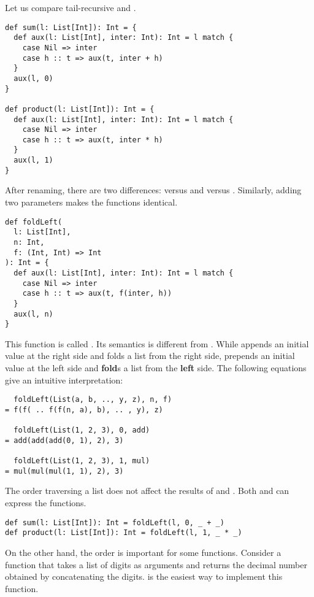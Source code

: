 Let us compare tail-recursive  and .

\begin{verbatim}
def sum(l: List[Int]): Int = {
  def aux(l: List[Int], inter: Int): Int = l match {
    case Nil => inter
    case h :: t => aux(t, inter + h)
  }
  aux(l, 0)
}

def product(l: List[Int]): Int = {
  def aux(l: List[Int], inter: Int): Int = l match {
    case Nil => inter
    case h :: t => aux(t, inter * h)
  }
  aux(l, 1)
}
\end{verbatim}

After renaming, there are two differences:  versus 
and  versus . Similarly, adding two parameters makes the
functions identical.

\begin{verbatim}
def foldLeft(
  l: List[Int],
  n: Int,
  f: (Int, Int) => Int
): Int = {
  def aux(l: List[Int], inter: Int): Int = l match {
    case Nil => inter
    case h :: t => aux(t, f(inter, h))
  }
  aux(l, n)
}
\end{verbatim}

This function is called . Its semantics is different from
. While  appends an initial value at
the right side and folds a list from the right side, 
prepends an initial value at the left side and \textbf{fold}s
a list from the \textbf{left} side. The following equations give an intuitive
interpretation:

\begin{verbatim}
  foldLeft(List(a, b, .., y, z), n, f)
= f(f( .. f(f(n, a), b), .. , y), z)

  foldLeft(List(1, 2, 3), 0, add)
= add(add(add(0, 1), 2), 3)

  foldLeft(List(1, 2, 3), 1, mul)
= mul(mul(mul(1, 1), 2), 3)
\end{verbatim}

The order traversing a list does not affect the results of  and
. Both  and  can express the functions.

\begin{verbatim}
def sum(l: List[Int]): Int = foldLeft(l, 0, _ + _)
def product(l: List[Int]): Int = foldLeft(l, 1, _ * _)
\end{verbatim}

On the other hand, the order is important for some functions.
Consider a function that takes a list of digits as arguments and returns the
decimal number obtained by concatenating the digits.
 is the easiest way to implement this function.

